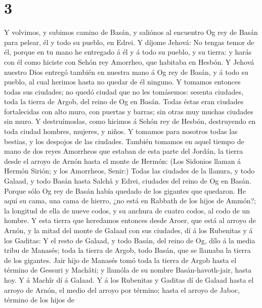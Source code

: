 \hypertarget{section-2}{%
\section{3}\label{section-2}}

 Y volvimos, y subimos camino de Basán, y saliónos al
encuentro Og rey de Basán para pelear, él y todo su pueblo, en Edrei.
 Y díjome Jehová: No tengas temor de él, porque en tu mano
he entregado á él y á todo su pueblo, y su tierra: y harás con él como
hiciste con Sehón rey Amorrheo, que habitaba en Hesbón.  Y
Jehová nuestro Dios entregó también en nuestra mano á Og rey de Basán, y
á todo su pueblo, al cual herimos hasta no quedar de él ninguno.
 Y tomamos entonces todas sus ciudades; no quedó ciudad
que no les tomásemos: sesenta ciudades, toda la tierra de Argob, del
reino de Og en Basán.  Todas éstas eran ciudades
fortalecidas con alto muro, con puertas y barras; sin otras muy muchas
ciudades sin muro.  Y destruímoslas, como hicimos á Sehón
rey de Hesbón, destruyendo en toda ciudad hombres, mujeres, y niños.
 Y tomamos para nosotros todas las bestias, y los despojos
de las ciudades.  También tomamos en aquel tiempo de mano
de dos reyes Amorrheos que estaban de esta parte del Jordán, la tierra
desde el arroyo de Arnón hasta el monte de Hermón:  (Los
Sidonios llaman á Hermón Sirión; y los Amorrheos, Senir:)
 Todas las ciudades de la llanura, y todo Galaad, y todo
Basán hasta Salchâ y Edrei, ciudades del reino de Og en Basán.
 Porque sólo Og rey de Basán había quedado de los
gigantes que quedaron. He aquí su cama, una cama de hierro, ¿no está en
Rabbath de los hijos de Ammón?; la longitud de ella de nueve codos, y su
anchura de cuatro codos, al codo de un hombre.  Y esta
tierra que heredamos entonces desde Aroer, que está al arroyo de Arnón,
y la mitad del monte de Galaad con sus ciudades, dí á los Rubenitas y á
los Gaditas:  Y el resto de Galaad, y todo Basán, del
reino de Og, dílo á la media tribu de Manasés; toda la tierra de Argob,
todo Basán, que se llamaba la tierra de los gigantes. 
Jair hijo de Manasés tomó toda la tierra de Argob hasta el término de
Gessuri y Machâti; y llamóla de su nombre Basán-havoth-jair, hasta hoy.
 Y á Machîr dí á Galaad.  Y á los
Rubenitas y Gaditas dí de Galaad hasta el arroyo de Arnón, el medio del
arroyo por término; hasta el arroyo de Jaboc, término de los hijos de
